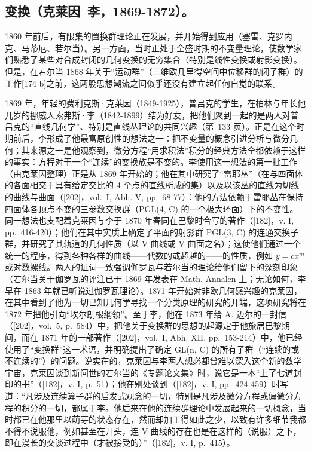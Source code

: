\subsection{变换（克莱因–李，1869-1872）。}


1860 年前后，有限集的置换群理论正在发展，并开始得到应用（塞雷、克罗内克、马蒂厄、若尔当）。另一方面，当时正处于全盛时期的不变量理论，使数学家们熟悉了某些对合成封闭的几何变换的无穷集合（特别是线性变换或射影变换）。但是，在若尔当 1868 年关于“运动群”（三维欧几里得空间中位移群的闭子群）的工作{[}174 b{]}之前，这两股思想潮流之间似乎还没有建立起任何自觉的联系。

1869 年，年轻的费利克斯·克莱因（1849-1925），普吕克的学生，在柏林与年长他几岁的挪威人索弗斯·李（1842-1899）结为好友，把他们聚到一起的是两人对普吕克的“直线几何学”、特别是直线丛理论的共同兴趣（第~133 页）。正是在这个时期前后，李形成了他最富原创性的想法之一：把不变量的概念引进分析与微分几何；其来源之一是他观察到，微分方程“用求积法”积分的经典方法全都依赖于这样的事实：方程对于一个“连续”的变换族是不变的。李使用这一想法的第一批工作（由克莱因整理）正是从 1869 年开始的；他在其中研究了“雷耶丛”（在与四面体的各面相交于具有给定交比的 4 个点的直线所成的集）以及以该丛的直线为切线的曲线与曲面（{[}202{]}，vol.~I, Abh. V, pp.~68-77）：他的方法依赖于雷耶丛在保持四面体各顶点不变的三参数交换群（PGL(4, C) 的一个极大环面）下的不变性。同一想法也支配着克莱因与李于 1870 年春同在巴黎时合写的著作（{[}182{]}，v. I, pp.~416-420）；他们在其中实质上确定了平面的射影群 PGL(3, C) 的连通交换子群，并研究了其轨道的几何性质（以 V 曲线或 V 曲面之名）；这使他们通过一个统一的程序，得到各种各样的曲线——代数的或超越的——的性质，例如 \(y = cx^m\) 或对数螺线。两人的证词一致强调伽罗瓦与若尔当的理论给他们留下的深刻印象（若尔当关于伽罗瓦的评注已于 1869 年发表在 Math. Annalen 上；无论如何，李早在 1863 年就已听说过伽罗瓦理论）。1871 年开始对非欧几何感兴趣的克莱因，在其中看到了他为一切已知几何学寻找一个分类原理的研究的开端，这项研究将在 1872 年把他引向“埃尔朗根纲领”。至于李，他在 1873 年给 A. 迈尔的一封信（{[}202{]}，vol.~5, p.~584）中，把他关于变换群的思想的起源定于他旅居巴黎期间，而在 1871 年的一部著作（{[}202{]}，vol.~I, Abh. XII, pp.~153-214）中，他已经使用了“变换群”这一术语，并明确提出了确定 GL(n, C) 的所有子群（“连续的或不连续的”）的问题。说实在的，克莱因与李两人想必都曾难以深入这个新的数学宇宙，克莱因谈到新问世的若尔当的《专题论文集》时，说它是一本“上了七道封印的书”（{[}182{]}，v. I, p.~51）；他在别处谈到（{[}182{]}，v. I, pp.~424-459）时写道：“凡涉及连续算子群的启发式观念的一切，特别是凡涉及微分方程或偏微分方程的积分的一切，都属于李。他后来在他的连续群理论中发展起来的一切概念，当时都已在他那里以萌芽的状态存在，然而却加工得如此之少，以致有许多细节我都不得不说服他，例如甚至在开头，连 V 曲线的存在也是在这样的（说服）之下，即在漫长的交谈过程中（才被接受的）”（{[}182{]}，v. I, p.~415）。

